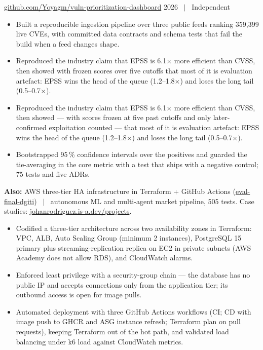 %
  {\href{https://github.com/Yoyagm/vuln-prioritization-dashboard}{github.com/Yoyagm/vuln-prioritization-dashboard}}%
  {2026 \ $\vert$ \ Independent}
\begin{itemize}
  \item Built a reproducible ingestion pipeline over three public feeds ranking 359{,}399 live CVEs,
        with committed data contracts and schema tests that fail the build when a feed changes shape.
  \ifonepage
  \item Reproduced the industry claim that EPSS is 6.1$\times$ more efficient than CVSS, then showed
        with frozen scores over five cutoffs that most of it is evaluation artefact: EPSS wins the head
        of the queue (1.2--1.8$\times$) and loses the long tail (0.5--0.7$\times$).
  \else
  \item Reproduced the industry claim that EPSS is 6.1$\times$ more efficient than CVSS, then showed ---
        with scores frozen at five past cutoffs and only later-confirmed exploitation counted --- that
        most of it is evaluation artefact: EPSS wins the head of the queue (1.2--1.8$\times$) and loses
        the long tail (0.5--0.7$\times$).
  \fi
  \ifonepage\else
  \item Bootstrapped 95\,\% confidence intervals over the positives and guarded the tie-averaging in the
        core metric with a test that ships with a negative control; 75 tests and five ADRs.
  \fi
\end{itemize}

\ifonepage
\vspace{0.6ex}
{\footnotesize\noindent\textbf{Also:} AWS three-tier HA infrastructure in Terraform + GitHub Actions
(\href{https://github.com/Yoyagm/eval-final-dgiti}{eval-final-dgiti}) \ $\vert$ \ autonomous ML and
multi-agent market pipeline, 505 tests. Case studies:
\href{https://johanrodriguez.is-a.dev/en/projects}{johanrodriguez.is-a.dev/projects}.\par}
\else

\begin{itemize}
  \item Codified a three-tier architecture across two availability zones in Terraform: VPC, ALB, Auto
        Scaling Group (minimum 2 instances), PostgreSQL 15 primary plus streaming-replication replica
        on EC2 in private subnets (AWS Academy does not allow RDS), and CloudWatch alarms.
  \item Enforced least privilege with a security-group chain --- the database has no public IP and
        accepts connections only from the application tier; its outbound access is open for image pulls.
  \item Automated deployment with three GitHub Actions workflows (CI; CD with image push to GHCR and
        ASG instance refresh; Terraform plan on pull requests), keeping Terraform out of the hot path,
        and validated load balancing under k6 load against CloudWatch metrics.
\end{itemize}

